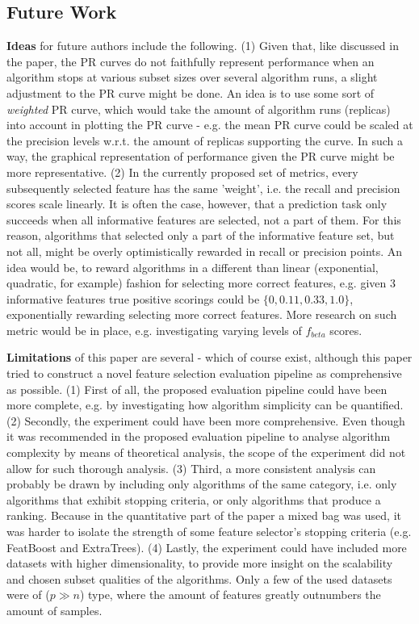 \documentclass{article}
\begin{document}
\subsection{Future Work}\label{sec:future-work}
\textbf{Ideas} for future authors include the following. (1) Given that, like discussed in the paper, the PR curves do not faithfully represent performance when an algorithm stops at various subset sizes over several algorithm runs, a slight adjustment to the PR curve might be done. An idea is to use some sort of \textit{weighted} PR curve, which would take the amount of algorithm runs (replicas) into account in plotting the PR curve - e.g. the mean PR curve could be scaled at the precision levels w.r.t. the amount of replicas supporting the curve. In such a way, the graphical representation of performance given the PR curve might be more representative. (2) In the currently proposed set of metrics, every subsequently selected feature has the same 'weight', i.e. the recall and precision scores scale linearly. It is often the case, however, that a prediction task only succeeds when all informative features are selected, not a part of them. For this reason, algorithms that selected only a part of the informative feature set, but not all, might be overly optimistically rewarded in recall or precision points. An idea would be, to reward algorithms in a different than linear (exponential, quadratic, for example) fashion for selecting more correct features, e.g. given 3 informative features true positive scorings could be $\{0, 0.11, 0.33, 1.0\}$, exponentially rewarding selecting more correct features. More research on such metric would be in place, e.g. investigating varying levels of $f_{beta}$ scores.

\textbf{Limitations} of this paper are several - which of course exist, although this paper tried to construct a novel feature selection evaluation pipeline as comprehensive as possible. (1) First of all, the proposed evaluation pipeline could have been more complete, e.g. by investigating how algorithm simplicity can be quantified. (2) Secondly, the experiment could have been more comprehensive. Even though it was recommended in the proposed evaluation pipeline to analyse algorithm complexity by means of theoretical analysis, the scope of the experiment did not allow for such thorough analysis. (3) Third, a more consistent analysis can probably be drawn by including only algorithms of the same category, i.e. only algorithms that exhibit stopping criteria, or only algorithms that produce a ranking. Because in the quantitative part of the paper a mixed bag was used, it was harder to isolate the strength of some feature selector's stopping criteria (e.g. FeatBoost and ExtraTrees). (4) Lastly, the experiment could have included more datasets with higher dimensionality, to provide more insight on the scalability and chosen subset qualities of the algorithms. Only a few of the used datasets were of ($p \gg n$) type, where the amount of features greatly outnumbers the amount of samples. 
\end{document}
